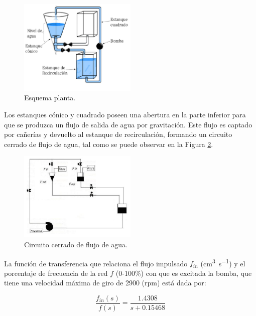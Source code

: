 \documentclass[11pt,letterpaper,notitlepage]{article}
\begin{document}
\begin{figure}[H]
\begin{center}
	\includegraphics[width=0.5\textwidth]{estanque}
	\caption{Esquema planta.}
	\label{esquema-planta}
\end{center}
\end{figure}

Los estanques cónico y cuadrado poseen una abertura en la parte inferior para que se produzca un flujo de salida de agua por gravitación. Este flujo es captado por cañerías y devuelto al estanque de recirculación, formando un circuito cerrado de flujo de agua, tal como se puede observar en la Figura \ref{flujo}.

\begin{figure}[H]
\begin{center}
	\includegraphics[width=0.5\textwidth]{estanque_flujo}
	\caption{Circuito cerrado de flujo de agua.}
	\label{flujo}
\end{center}
\end{figure}

La función de transferencia que relaciona el flujo impulsado $f_{in}$ (\si{\cubic\centi\metre\per\second}) y el porcentaje de frecuencia de la red $f$ (0-100\%) con que es excitada la bomba, que tiene una velocidad máxima de giro de 2900 (rpm) está dada por:

\begin{equation}
    \frac{f_{in}(s)}{f(s)}=\frac{1.4308}{s+0.15468}
\end{equation}
\end{document}
